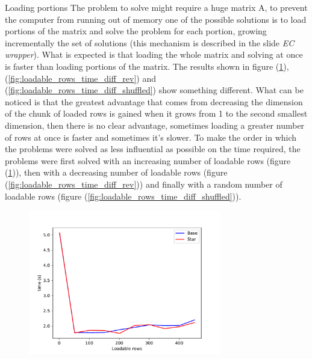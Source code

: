 \documentclass{beamer}
\begin{document}
\begin{frame}{Loading portions}
    The problem to solve might require a huge matrix A,
    to prevent the computer from running out of memory
    one of the possible solutions is to load portions of the matrix
    and solve the problem for each portion, growing incrementally
    the set of solutions (this mechanism is described in the slide \textit{EC wrapper}).
    What is expected is that loading the whole matrix and solving
    at once is faster than loading portions of the matrix.
    The results shown in figure (\ref{fig:loadable_rows_time_diff}), 
    (\ref{fig:loadable_rows_time_diff_rev}) and (\ref{fig:loadable_rows_time_diff_shuffled})
    show something different.
    What can be noticed is that the greatest advantage that comes
    from decreasing the dimension of the chunk of loaded rows is gained
    when it grows from 1 to the second smallest dimension, then there is no clear advantage,
    sometimes loading a greater number of rows at once is faster
    and sometimes it's slower.
    To make the order in which the problems were solved as less influential as possible 
    on the time required, the problems were first solved with an increasing number of loadable rows (figure (\ref{fig:loadable_rows_time_diff})),
    then with a decreasing number of loadable rows (figure (\ref{fig:loadable_rows_time_diff_rev})) and finally with a random number of loadable rows
    (figure (\ref{fig:loadable_rows_time_diff_shuffled})).
\end{frame}

\begin{frame}
    \begin{figure}
        \centering
        \includegraphics[width=0.75\textwidth]{loadable_rows_time_diff.pdf}
        \label{fig:loadable_rows_time_diff}
    \end{figure}
\end{frame}
\end{document}
